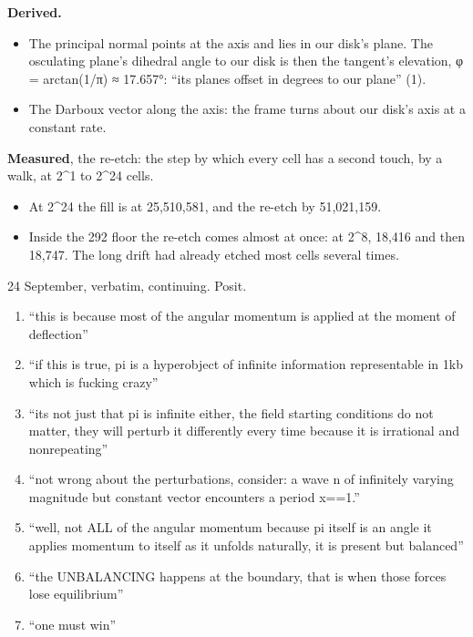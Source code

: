 \textbf{Derived.}

\begin{itemize}
\item The principal normal points at the axis and lies in our disk's plane. The osculating plane's dihedral angle to our disk is then the tangent's elevation, φ = arctan(1/π) ≈ 17.657°: “its planes offset in degrees to our plane” (1).
\item The Darboux vector along the axis: the frame turns about our disk's axis at a constant rate.
\end{itemize}

\textbf{Measured}, the re-etch: the step by which every cell has a second touch, by a walk, at 2\textasciicircum{}1 to 2\textasciicircum{}24 cells.

\begin{itemize}
\item At 2\textasciicircum{}24 the fill is at 25,510,581, and the re-etch by 51,021,159.
\item Inside the 292 floor the re-etch comes almost at once: at 2\textasciicircum{}8, 18,416 and then 18,747. The long drift had already etched most cells several times.
\end{itemize}

24 September, verbatim, continuing. Posit.

\begin{enumerate}
\item “this is because most of the angular momentum is applied at the moment of deflection”
\item “if this is true, pi is a hyperobject of infinite information representable in 1kb which is fucking crazy”
\item “its not just that pi is infinite either, the field starting conditions do not matter, they will perturb it differently every time because it is irrational and nonrepeating”
\item “not wrong about the perturbations, consider: a wave n of infinitely varying magnitude but constant vector encounters a period x==1.”
\item “well, not ALL of the angular momentum because pi itself is an angle it applies momentum to itself as it unfolds naturally, it is present but balanced”
\item “the UNBALANCING happens at the boundary, that is when those forces lose equilibrium”
\item “one must win”
\end{enumerate}

